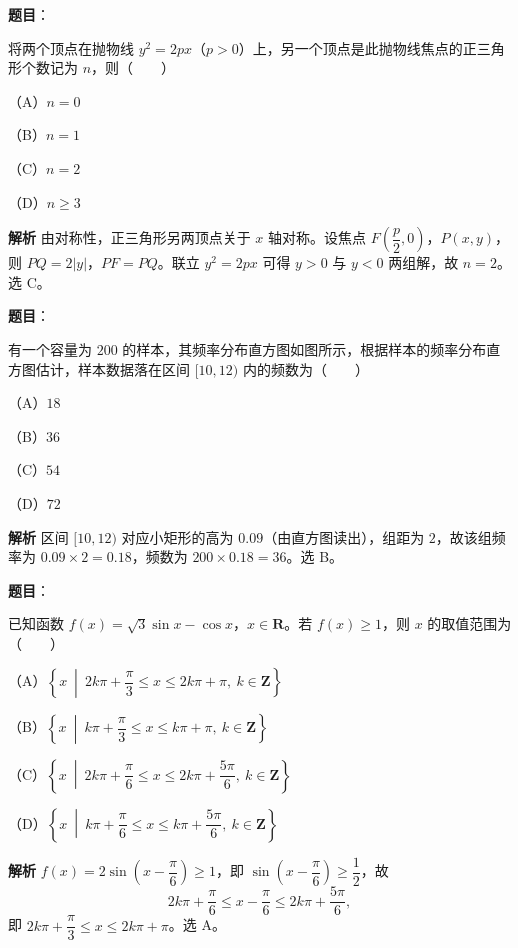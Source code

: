 \begin{answer}

\textbf{题目}：

将两个顶点在抛物线 $y^2=2px$（$p>0$）上，另一个顶点是此抛物线焦点的正三角形个数记为 $n$，则\mbox{（　　）}

（A）$n=0$

（B）$n=1$

（C）$n=2$

（D）$n\geqslant3$

\textbf{解析}
由对称性，正三角形另两顶点关于 $x$ 轴对称。设焦点 $F\left(\dfrac p2,0\right)$，$P(x,y)$，则 $PQ=2|y|$，$PF=PQ$。联立 $y^2=2px$ 可得 $y>0$ 与 $y<0$ 两组解，故 $n=2$。选 C。


\end{answer}
\begin{answer}

\textbf{题目}：

有一个容量为 $200$ 的样本，其频率分布直方图如图所示，根据样本的频率分布直方图估计，样本数据落在区间 $[10,12)$ 内的频数为\mbox{（　　）}

（A）$18$

（B）$36$

（C）$54$

（D）$72$
\nopagebreak[4]
\begin{center}\end{center}
\nopagebreak[4]
\textbf{解析}
区间 $[10,12)$ 对应小矩形的高为 $0.09$（由直方图读出），组距为 $2$，故该组频率为 $0.09\times2=0.18$，频数为 $200\times0.18=36$。选 B。


\end{answer}
\begin{answer}

\textbf{题目}：

已知函数 $f(x)=\sqrt3\sin x-\cos x$，$x\in\mathbf R$。若 $f(x)\geqslant1$，则 $x$ 的取值范围为\mbox{（　　）}

（A）$\left\{x\ \middle|\ 2k\pi+\dfrac\pi3\leqslant x\leqslant2k\pi+\pi,\ k\in\mathbf Z\right\}$

（B）$\left\{x\ \middle|\ k\pi+\dfrac\pi3\leqslant x\leqslant k\pi+\pi,\ k\in\mathbf Z\right\}$

（C）$\left\{x\ \middle|\ 2k\pi+\dfrac\pi6\leqslant x\leqslant2k\pi+\dfrac{5\pi}6,\ k\in\mathbf Z\right\}$

（D）$\left\{x\ \middle|\ k\pi+\dfrac\pi6\leqslant x\leqslant k\pi+\dfrac{5\pi}6,\ k\in\mathbf Z\right\}$

\textbf{解析}
$f(x)=2\sin\left(x-\dfrac\pi6\right)\geqslant1$，即 $\sin\left(x-\dfrac\pi6\right)\geqslant\dfrac12$，故
\nopagebreak[4]
\[2k\pi+\frac\pi6\leqslant x-\frac\pi6\leqslant2k\pi+\frac{5\pi}6,\]
即 $2k\pi+\dfrac\pi3\leqslant x\leqslant2k\pi+\pi$。选 A。


\end{answer}
